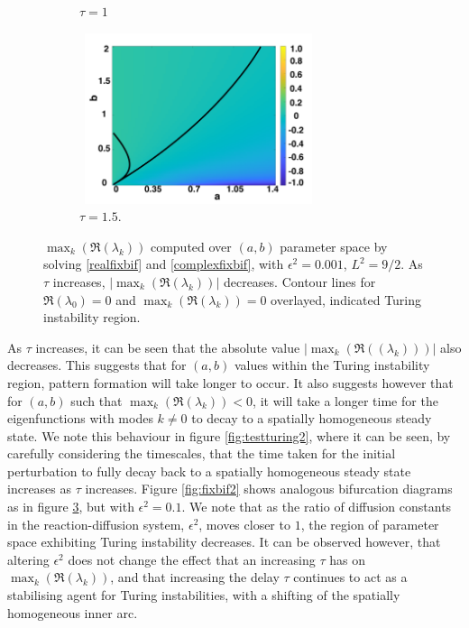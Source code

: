 \begin{figure}[H]
\begin{subfigure}[t]{0.45\textwidth}
        \caption{$\tau=1$}
        \label{}
    \end{subfigure}
    \hfill
    \begin{subfigure}[t]{0.45\textwidth}
        \centering
        \includegraphics[width=7cm,height=5cm]{tau15bif.png}
        \caption{$\tau=1.5$.}
        \label{}
    \end{subfigure}
    \caption{$\max_k(\Re(\lambda_k))$ computed over $(a,b)$ parameter space by solving \eqref{realfixbif} and \eqref{complexfixbif}, with $\epsilon^2=0.001$, $L^2=9/2$. As $\tau$ increases, $|\max_k(\Re(\lambda_k))|$ decreases. Contour lines for $\Re(\lambda_0)=0$ and $\max_k(\Re(\lambda_k))=0$ overlayed, indicated Turing instability region.}
    \label{fig:lambdavary}
\end{figure}
As $\tau$ increases, it can be seen that the absolute value $|\max_k(\Re((\lambda_k)))|$ also decreases. This suggests that for $(a,b)$ values within the Turing instability region, pattern formation will take longer to occur. It also suggests however that for $(a,b)$ such that $\max_k(\Re(\lambda_k))<0$, it will take a longer time for the eigenfunctions with modes $k\neq0$ to decay to a spatially homogeneous steady state. We note this behaviour in figure \ref{fig:testturing2}, where it can be seen, by carefully considering the timescales, that the time taken for the initial perturbation to fully decay back to a spatially homogeneous steady state increases as $\tau$ increases. Figure \ref{fig:fixbif2} shows analogous bifurcation diagrams as in figure \ref{fig:lambdavary}, but with $\epsilon^2=0.1$. We note that as the ratio of diffusion constants in the reaction-diffusion system, $\epsilon^2$, moves closer to $1$, the region of parameter space exhibiting Turing instability decreases. It can be observed however, that altering $\epsilon^2$ does not change the effect that an increasing $\tau$ has on $\max_k(\Re(\lambda_k))$, and that increasing the delay $\tau$ continues to act as a stabilising agent for Turing instabilities, with a shifting of the spatially homogeneous inner arc.

